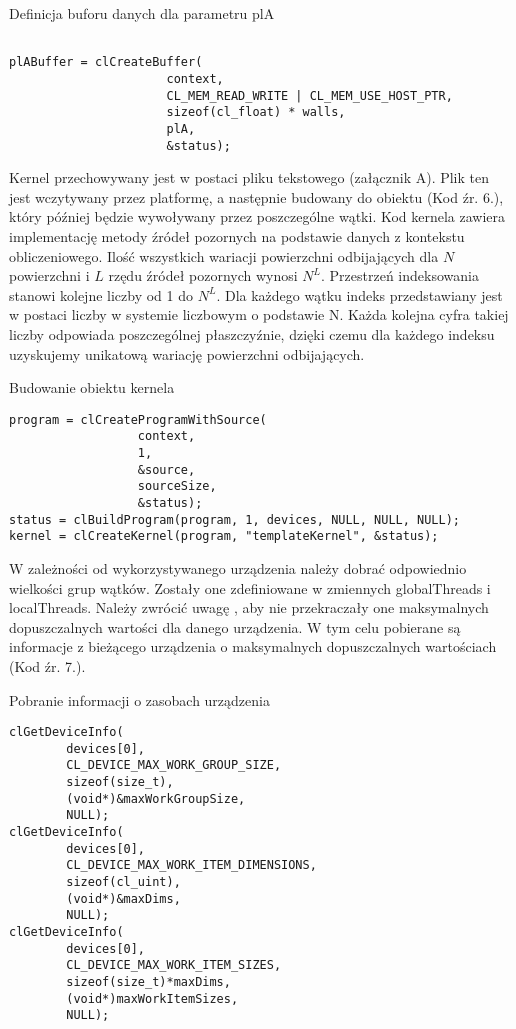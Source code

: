 \begin{program}
\caption{Definicja buforu danych dla parametru plA}
\begin{lstlisting}

plABuffer = clCreateBuffer(
                      context, 
                      CL_MEM_READ_WRITE | CL_MEM_USE_HOST_PTR,
                      sizeof(cl_float) * walls,
                      plA, 
                      &status);
\end{lstlisting}
\end{program}
Kernel przechowywany jest w postaci pliku tekstowego (załącznik A). Plik ten jest wczytywany przez platformę, a następnie budowany do obiektu (Kod źr. 6.), który później będzie wywoływany przez poszczególne wątki. Kod kernela zawiera implementację metody źródeł pozornych na podstawie danych z kontekstu obliczeniowego. Ilość wszystkich wariacji powierzchni odbijających dla $N$ powierzchni i $L$ rzędu źródeł pozornych wynosi $N^L$. Przestrzeń indeksowania stanowi kolejne liczby od 1 do $N^L$. Dla każdego wątku indeks przedstawiany jest w postaci liczby w systemie liczbowym o podstawie N. Każda kolejna cyfra takiej liczby odpowiada poszczególnej płaszczyźnie, dzięki czemu dla każdego indeksu uzyskujemy unikatową wariację powierzchni odbijających.
\begin{program}
\caption{Budowanie obiektu kernela}
\begin{lstlisting}
program = clCreateProgramWithSource(
                  context, 
                  1, 
                  &source,
                  sourceSize,
                  &status);
status = clBuildProgram(program, 1, devices, NULL, NULL, NULL);
kernel = clCreateKernel(program, "templateKernel", &status);
\end{lstlisting}
\end{program}
W zależności od wykorzystywanego urządzenia należy dobrać odpowiednio wielkości grup wątków. Zostały one zdefiniowane w zmiennych globalThreads i localThreads. Należy zwrócić uwagę , aby nie przekraczały one maksymalnych dopuszczalnych wartości dla danego urządzenia. W tym celu pobierane są informacje z bieżącego urządzenia o maksymalnych dopuszczalnych wartościach (Kod źr. 7.).
\begin{program}
\caption{Pobranie informacji o zasobach urządzenia}
\begin{lstlisting}
clGetDeviceInfo(
        devices[0], 
        CL_DEVICE_MAX_WORK_GROUP_SIZE, 
        sizeof(size_t), 
        (void*)&maxWorkGroupSize, 
        NULL);
clGetDeviceInfo(
        devices[0], 
        CL_DEVICE_MAX_WORK_ITEM_DIMENSIONS, 
        sizeof(cl_uint), 
        (void*)&maxDims, 
        NULL);
clGetDeviceInfo(
        devices[0], 
        CL_DEVICE_MAX_WORK_ITEM_SIZES, 
        sizeof(size_t)*maxDims,
        (void*)maxWorkItemSizes,
        NULL);
\end{lstlisting}
\end{program}
